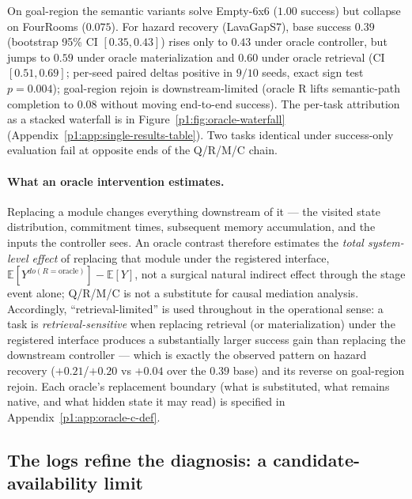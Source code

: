 \documentclass{article}
\begin{document}
On goal-region the semantic variants solve Empty-6x6 ($1.00$ success) but collapse on FourRooms ($0.075$). For hazard recovery (LavaGapS7), base success $0.39$ (bootstrap 95\% CI $[0.35,0.43]$) rises only to $0.43$ under oracle controller, but jumps to $0.59$ under oracle materialization and $0.60$ under oracle retrieval (CI $[0.51,0.69]$; per-seed paired deltas positive in $9/10$ seeds, exact sign test $p{=}0.004$); goal-region rejoin is downstream-limited (oracle R lifts semantic-path completion to $0.08$ without moving end-to-end success). The per-task attribution as a stacked waterfall is in Figure~\ref{p1:fig:oracle-waterfall} (Appendix~\ref{p1:app:single-results-table}). Two tasks identical under success-only evaluation fail at opposite ends of the Q/R/M/C chain.

\paragraph{What an oracle intervention estimates.} Replacing a module changes everything downstream of it --- the visited state distribution, commitment times, subsequent memory accumulation, and the inputs the controller sees. An oracle contrast therefore estimates the \emph{total system-level effect} of replacing that module under the registered interface, $\mathbb{E}[Y^{do(R=\text{oracle})}] - \mathbb{E}[Y]$, not a surgical natural indirect effect through the stage event alone; Q/R/M/C is not a substitute for causal mediation analysis. Accordingly, ``retrieval-limited'' is used throughout in the operational sense: a task is \emph{retrieval-sensitive} when replacing retrieval (or materialization) under the registered interface produces a substantially larger success gain than replacing the downstream controller --- which is exactly the observed pattern on hazard recovery ($+0.21$/$+0.20$ vs $+0.04$ over the $0.39$ base) and its reverse on goal-region rejoin. Each oracle's replacement boundary (what is substituted, what remains native, and what hidden state it may read) is specified in Appendix~\ref{p1:app:oracle-c-def}.

\subsection{The logs refine the diagnosis: a candidate-availability limit}
\label{p1:sec:refined-attribution}
\end{document}
